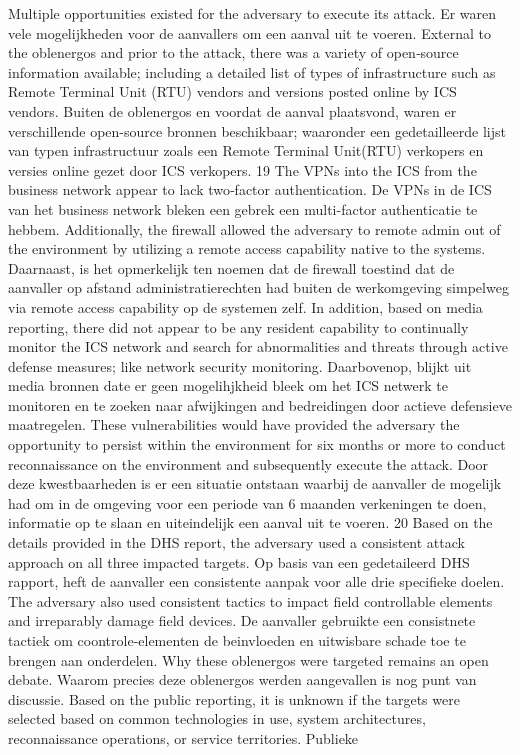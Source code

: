 {Multiple opportunities existed for the adversary to execute its attack. Er waren vele mogelijkheden
voor de aanvallers om een aanval uit te voeren.
External to the oblenergos and prior to the attack, there was a variety of open‐source information
available; including a detailed list of types of infrastructure such as Remote Terminal Unit (RTU)
vendors and versions posted online by ICS vendors. Buiten de oblenergos en voordat de aanval
plaatsvond, waren er verschillende open-source bronnen beschikbaar; waaronder een gedetailleerde
lijst van typen infrastructuur zoals een Remote Terminal Unit(RTU) verkopers en versies online gezet
door ICS verkopers.
19 The VPNs into the ICS from the business network appear to lack two‐factor authentication. De
VPNs in de ICS van het business network bleken een gebrek een multi-factor authenticatie te
hebbem.
Additionally, the firewall allowed the adversary to remote admin out of the environment by utilizing
a remote access capability native to the systems. Daarnaast, is het opmerkelijk ten noemen dat de
firewall toestind dat de aanvaller op afstand administratierechten had buiten de werkomgeving
simpelweg via remote access capability op de systemen zelf.
In addition, based on media reporting, there did not appear to be any resident capability to
continually monitor the ICS network and search for abnormalities and threats through active defense
measures; like network security monitoring. Daarbovenop, blijkt uit media bronnen date er geen
mogelihjkheid bleek om het ICS netwerk te monitoren en te zoeken naar afwijkingen and
bedreidingen door actieve defensieve maatregelen.
These vulnerabilities would have provided the adversary the opportunity to persist within the
environment for six months or more to conduct reconnaissance on the environment and
subsequently execute the attack. Door deze kwestbaarheden is er een situatie ontstaan waarbij de
aanvaller de mogelijk had om in de omgeving voor een periode van 6 maanden verkeningen te doen,
informatie op te slaan en uiteindelijk een aanval uit te voeren.
20 Based on the details provided in the DHS report, the adversary used a consistent attack approach
on all three impacted targets. Op basis van een gedetaileerd DHS rapport, heft de aanvaller een
consistente aanpak voor alle drie specifieke doelen.
The adversary also used consistent tactics to impact field controllable elements and irreparably
damage field devices. De aanvaller gebruikte een consistnete tactiek om coontrole-elementen de
beinvloeden en uitwisbare schade toe te brengen aan onderdelen.
Why these oblenergos were targeted remains an open debate. Waarom precies deze oblenergos
werden aangevallen is nog punt van discussie.
Based on the public reporting, it is unknown if the targets were selected based on common
technologies in use, system architectures, reconnaissance operations, or service territories. Publieke

}

